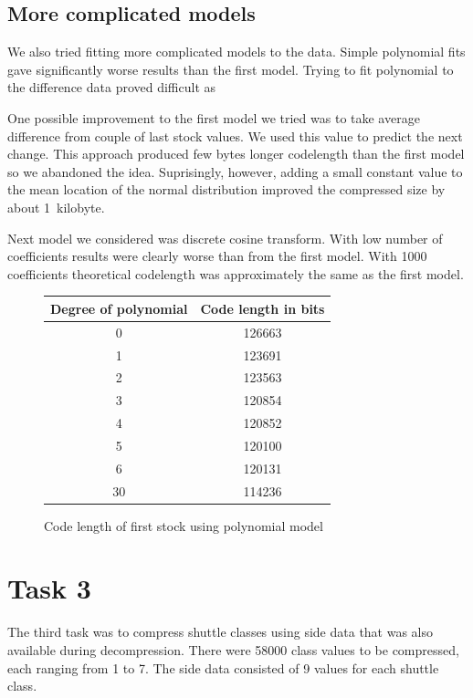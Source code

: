 \documentclass{article}
\begin{document}
\subsection {More complicated models}
We also tried fitting more complicated models to the data.
Simple polynomial fits gave significantly worse results than the first model.
Trying to fit polynomial to the difference data proved difficult as

One possible improvement to the first model we tried was to take average difference
from couple of last stock values. We used this value to predict the next change.
This approach produced few bytes longer codelength than the first model so we
abandoned the idea.
Suprisingly, however, adding a small constant value to the mean location of the normal distribution improved the compressed size by about 1~kilobyte.

Next model we considered was discrete cosine transform.
With low number of coefficients results were clearly worse than from the first model.
With 1000 coefficients theoretical codelength was approximately the same as the first model.

\begin{figure}
\begin{center}
\begin{tabular}{|c|c|}
\hline
    Degree of polynomial & Code length in bits\\ \hline
    0      & 126663 \\  \hline
    1      & 123691 \\ \hline
    2      & 123563 \\ \hline
    3      & 120854 \\ \hline
    4      & 120852 \\ \hline
    5      & 120100 \\ \hline
    6      & 120131 \\ \hline
    30     & 114236 \\ \hline
\end{tabular}
\end{center}
\caption{Code length of first stock using polynomial model}
\label{ex2_polys}
\end{figure}

\section{Task 3}

The third task was to compress shuttle classes using side data that was also available during decompression.
There were 58000 class values to be compressed, each ranging from 1 to 7.
The side data consisted of 9 values for each shuttle class.
\end{document}
